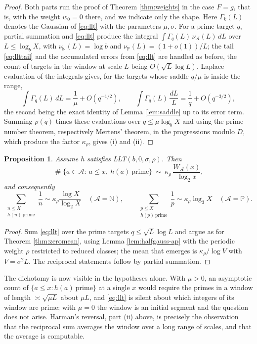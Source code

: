 \documentclass[11pt,reqno]{amsart}
\theoremstyle{plain}
\newtheorem{proposition}[theorem]{Proposition}
\theoremstyle{definition}
\newcommand{\N}{\mathbb{N}}
\DeclareMathOperator{\Card}{\#}
\begin{document}
\begin{proof}
Both parts run the proof of Theorem \ref{thm:weights} in the case $F=g$, that is, with the weight $w_0=0$ there, and we indicate only the shape. Here $\Gamma_k(L)$ denotes the Gaussian of \eqref{eq:llt} with the parameters $\mu,\sigma$. For a prime target $q$, partial summation and \eqref{eq:llt} produce the integral $\int\Gamma_q(L)\,\nu_{\mathcal A}(L)\,dL$ over $L\le\log_bX$, with $\nu_{\N}(L)=\log b$ and $\nu_{\mathbb P}(L)=(1+o(1))/L$; the tail \eqref{eq:llttail} and the accumulated errors from \eqref{eq:llt} are handled as before, the count of targets in the window at scale $L$ being $O(\sqrt L\log L)$. Laplace evaluation of the integrals gives, for the targets whose saddle $q/\mu$ is inside the range,
\[
\int\Gamma_q(L)\,dL=\frac1\mu+O(q^{-1/2}),
\qquad
\int\Gamma_q(L)\,\frac{dL}L=\frac1q+O(q^{-3/2}),
\]
the second being the exact identity of Lemma \ref{lem:saddle} up to its error term. Summing $\rho(q)$ times these evaluations over $q\le\mu\log_bX$ and using the prime number theorem, respectively Mertens' theorem, in the progressions modulo $D$, which produce the factor $\kappa_\rho$, gives (i) and (ii).
\end{proof}

\begin{proposition}\label{prop:zerotransfer}
Assume $h$ satisfies LLT$(b,0,\sigma,\rho)$. Then
\[
\Card\{a\in\mathcal A:\ a\le x,\ h(a)\ \text{prime}\}\ \sim\ \kappa_\rho\,\frac{W_{\mathcal A}(x)}{\log_2x},
\]
and consequently
\[
\sum_{\substack{n\le X\\ h(n)\ \text{prime}}}\frac1n\sim\kappa_\rho\frac{\log X}{\log_2X}
\quad(\mathcal A=\N),
\qquad
\sum_{\substack{p\le X\\ h(p)\ \text{prime}}}\frac1p\sim\kappa_\rho\log_3X
\quad(\mathcal A=\mathbb P).
\]
\end{proposition}

\begin{proof}
Sum \eqref{eq:llt} over the prime targets $q\le\sqrt L\log L$ and argue as for Theorem \ref{thm:zeromean}, using Lemma \ref{lem:halfgauss-ap} with the periodic weight $\rho$ restricted to reduced classes; the mean that emerges is $\kappa_\rho/\log V$ with $V=\sigma^{2}L$. The reciprocal statements follow by partial summation.
\end{proof}

The dichotomy is now visible in the hypotheses alone. With $\mu>0$, an asymptotic count of $\{a\le x: h(a)\ \text{prime}\}$ at a single $x$ would require the primes in a window of length $\asymp\sqrt{\mu L}$ about $\mu L$, and \eqref{eq:llt} is silent about which integers of its window are prime; with $\mu=0$ the window is an initial segment and the question does not arise. Harman's reversal, part (ii) above, is precisely the observation that the reciprocal sum averages the window over a long range of scales, and that the average is computable.
\end{document}
